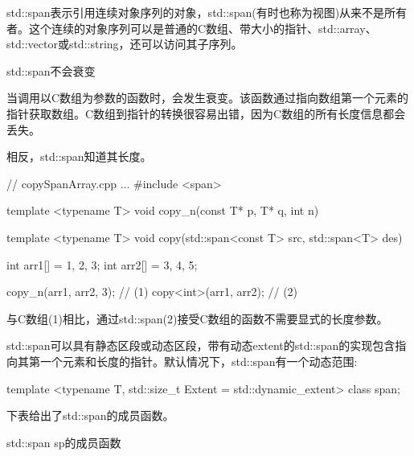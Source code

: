 std::span表示引用连续对象序列的对象，std::span(有时也称为视图)从来不是所有者。这个连续的对象序列可以是普通的C数组、带大小的指针、std::array、std::vector或std::string，还可以访问其子序列。

\begin{myTip}{std::span不会衰变}
	
当调用以C数组为参数的函数时，会发生衰变。该函数通过指向数组第一个元素的指针获取数组。C数组到指针的转换很容易出错，因为C数组的所有长度信息都会丢失。

相反，std::span知道其长度。

\begin{cpp}
// copySpanArray.cpp
...
#include <span>

template <typename T>
void copy_n(const T* p, T* q, int n){}

template <typename T>
void copy(std::span<const T> src, std::span<T> des){}

int arr1[] = {1, 2, 3};
int arr2[] = {3, 4, 5};

copy_n(arr1, arr2, 3); // (1)
copy<int>(arr1, arr2); // (2)
\end{cpp}

与C数组(1)相比，通过std::span(2)接受C数组的函数不需要显式的长度参数。
\end{myTip}

std::span可以具有静态区段或动态区段，带有动态extent的std::span的实现包含指向其第一个元素和长度的指针。默认情况下，std::span有一个动态范围:


\begin{cpp}
template <typename T, std::size_t Extent = std::dynamic_extent>
class span;
\end{cpp}

下表给出了std::span的成员函数。

\begin{center}
std::span sp的成员函数
\end{center}

